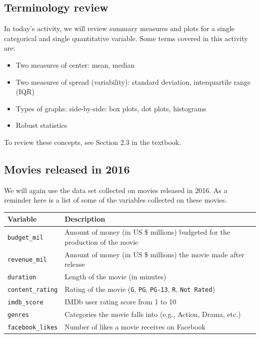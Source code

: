 \documentclass[
]{report}
\begin{document}
\hypertarget{terminology-review-7}{%
\subsection{Terminology review}\label{terminology-review-7}}

In today's activity, we will review summary measures and plots for a single categorical and single quantitative variable. Some terms covered in this activity are:

\begin{itemize}
\item
  Two measures of center: mean, median
\item
  Two measures of spread (variability): standard deviation, interquartile range (IQR)
\item
  Types of graphs: side-by-side: box plots, dot plots, histograms
\item
  Robust statistics
\end{itemize}

To review these concepts, see Section 2.3 in the textbook.

\hypertarget{movies-released-in-2016-1}{%
\subsection{Movies released in 2016}\label{movies-released-in-2016-1}}

We will again use the data set collected on movies released in 2016. As a reminder here is a list of some of the variables collected on these movies.

\begin{longtable}[]{@{}
  >{\raggedright\arraybackslash}p{}
  >{\raggedright\arraybackslash}p{}@{}}
\toprule
\textbf{Variable} & \textbf{Description} \\
\midrule
\endhead
\texttt{budget\_mil} & Amount of money (in US \$ millions) budgeted for the production of the movie \\
\texttt{revenue\_mil} & Amount of money (in US \$ millions) the movie made after release \\
\texttt{duration} & Length of the movie (in minutes) \\
\texttt{content\_rating} & Rating of the movie (\texttt{G}, \texttt{PG}, \texttt{PG-13}, \texttt{R}, \texttt{Not\ Rated}) \\
\texttt{imdb\_score} & IMDb user rating score from 1 to 10 \\
\texttt{genres} & Categories the movie falls into (e.g., Action, Drama, etc.) \\
\texttt{facebook\_likes} & Number of likes a movie receives on Facebook \\
\bottomrule
\end{longtable}
\end{document}
